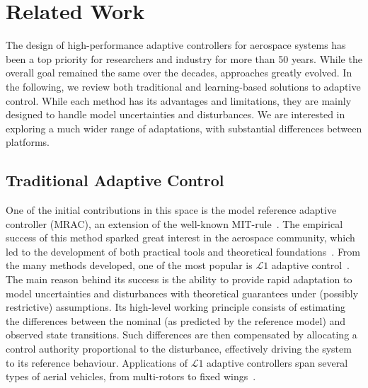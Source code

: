 \section{Related Work}
\label{sec:rel_work}


The design of high-performance adaptive controllers for aerospace systems has been a top priority for researchers and industry for more than 50 years.
%
While the overall goal remained the same over the decades, approaches greatly evolved.
%
In the following, we review both traditional and learning-based solutions to adaptive control.
%
While each method has its advantages and limitations, they are mainly designed to handle model uncertainties and disturbances.
%
We are interested in exploring a much wider range of adaptations, with substantial differences between platforms.


\subsection{Traditional Adaptive Control}

One of the initial contributions in this space is the model reference adaptive controller (MRAC), an extension of the well-known MIT-rule~\cite{MAREELSMit}.
%
The empirical success of this method sparked great interest in the aerospace community, which led to the development of both practical tools and theoretical foundations~\cite{aastrom2013adaptive, lavretsky2013robust}.
%
From the many methods developed, one of the most popular is $\mathcal{L}1$ adaptive control~\cite{cao2008design,hovakimyan2010l1}.
%
The main reason behind its success is the ability to provide rapid adaptation to model uncertainties and disturbances with theoretical guarantees under (possibly restrictive) assumptions.
%
Its high-level working principle consists of estimating the differences between the nominal (as predicted by the reference model) and observed state transitions.
%
Such differences are then compensated by allocating a control authority proportional to the disturbance, effectively driving the system to its reference behaviour.
%
Applications of $\mathcal{L}1$ adaptive controllers span several types of aerial vehicles, from multi-rotors to fixed wings~\cite{mallikarjunan2012l1, gregory2009l1}.

